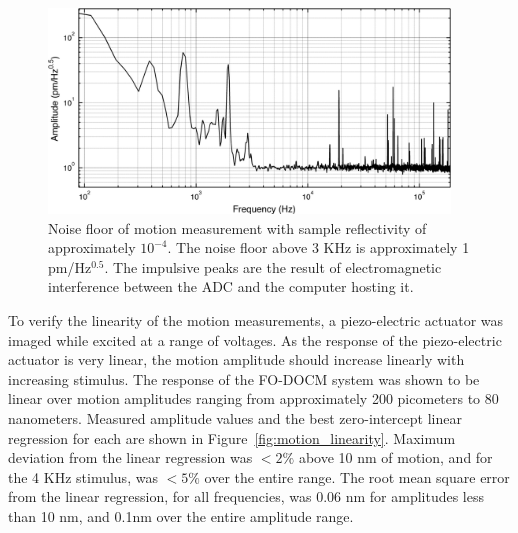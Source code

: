 
\begin{figure}[h!]
\centering
\includegraphics[width=0.95\textwidth]{Images/Results/noise_floor_2_big.png}
\caption[Noise floor of motion measurement with sample reflectivity of approximately $10^{-4}$.]{Noise floor of motion measurement with sample reflectivity of approximately $10^{-4}$. The noise floor above 3 KHz is approximately 1 pm/Hz$^{0.5}$. The impulsive peaks are the result of electromagnetic interference between the ADC and the computer hosting it. \label{fig:noise_floor2}}
\end{figure}

To verify the linearity of the motion measurements, a piezo-electric actuator was imaged while excited at a range of voltages. As the response of the piezo-electric actuator is very linear, the motion amplitude should increase linearly with increasing stimulus. \cite{klaassen} The response of the FO-DOCM system was shown to be linear over motion amplitudes ranging from approximately 200 picometers to 80 nanometers. Measured amplitude values and the best zero-intercept linear regression for each are shown in Figure~\ref{fig:motion_linearity}. Maximum deviation from the linear regression was $<2\%$ above 10 nm of motion, and for the 4 KHz stimulus, was $<5\%$ over the entire range. The root mean square error from the linear regression, for all frequencies, was 0.06 nm for amplitudes less than 10 nm, and 0.1nm over the entire amplitude range.

